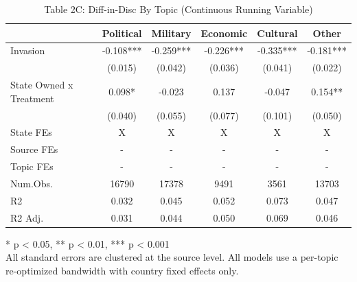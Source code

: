\begin{table}[!t]
\caption{Table 2C: Diff-in-Disc By Topic (Continuous Running Variable)} 
\fontsize{12.0pt}{14.4pt}\selectfont
\begin{tabular*}{\linewidth}{@{\extracolsep{\fill}}lccccc}
\toprule
  & Political & Military & Economic & Cultural & Other \\ 
\midrule\addlinespace[2.5pt]
Invasion & -0.108*** & -0.259*** & -0.226*** & -0.335*** & -0.181*** \\ 
 & (0.015) & (0.042) & (0.036) & (0.041) & (0.022) \\ 
State Owned x Treatment & 0.098* & -0.023 & 0.137 & -0.047 & 0.154** \\ 
{} & {(0.040)} & {(0.055)} & {(0.077)} & {(0.101)} & {(0.050)} \\ 
State FEs & X & X & X & X & X \\ 
Source FEs & - & - & - & - & - \\ 
Topic FEs & - & - & - & - & - \\ 
Num.Obs. & 16790 & 17378 & 9491 & 3561 & 13703 \\ 
R2 & 0.032 & 0.045 & 0.052 & 0.073 & 0.047 \\ 
R2 Adj. & 0.031 & 0.044 & 0.050 & 0.069 & 0.046 \\ 
\bottomrule
\end{tabular*}
\begin{minipage}{\linewidth}
* p < 0.05, ** p < 0.01, *** p < 0.001\\
All standard errors are clustered at the source level. All models use a
per-topic re-optimized bandwidth with country fixed effects only.\\
\end{minipage}
\end{table}

